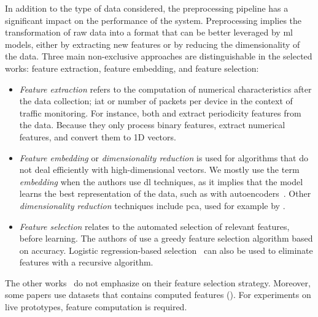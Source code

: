 In addition to the type of data considered, the preprocessing pipeline has a significant impact on the performance of the system.
Preprocessing implies the transformation of raw data into a format that can be better leveraged by \gls{ml} models, either by extracting new features or by reducing the dimensionality of the data.
Three main non-exclusive approaches are distinguishable in the selected works: feature extraction, feature embedding, and feature selection:
\begin{itemize}
  \item \emph{Feature extraction} refers to the computation of numerical characteristics after the data collection; \eg \gls{iat} or number of packets per device in the context of traffic monitoring.
  For instance, both \textcite{nguyen_DIoTFederatedSelflearning_2019} and \textcite{pahl_AllEyesYou_2018} extract periodicity features from the data.
  Because they only process binary features, \textcite{qin_LineSpeedScalableIntrusion_2020a} extract numerical features, and convert them to 1D vectors.
  
  \item \emph{Feature embedding} or \emph{dimensionality reduction} is used for algorithms that do not deal efficiently with high-dimensional vectors.
  We mostly use the term \emph{embedding} when the authors use \gls{dl} techniques, as it implies that the model learns the best representation of the data, such as with autoencoders~\cite{chen_Networkanomalydetection_2020}.
  Other \emph{dimensionality reduction} techniques include \gls{pca}, used for example by \textcite{kim_CollaborativeAnomalyDetection_2020}.

  \item \emph{Feature selection} relates to the automated selection of relevant features, before learning.
  The authors of \cite{qin_FederatedLearningBasedNetwork_2021} use a greedy feature selection algorithm based on accuracy.
  Logistic regression-based selection~\cite{al-athbaal-marri_FederatedMimicLearning_2020} can also be used to eliminate features with a recursive algorithm.
\end{itemize}

The other works~\cite{zhang_BlockchainbasedFederatedLearning_2020,schneble_Attackdetectionusing_2019,li_DeepFedFederatedDeep_2020,rathore_BlockSecIoTNetBlockchainbaseddecentralized_2019} do not emphasize on their feature selection strategy.
Moreover, some papers \cite{li_DeepFedFederatedDeep_2020,schneble_Attackdetectionusing_2019,zhao_MultiTaskNetworkAnomaly_2019} use datasets that contains computed features ().
For experiments on live prototypes, feature computation is required.

